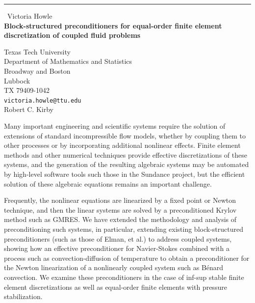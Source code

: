 \documentclass{report}
\begin{document}
\begin{center}
\rule{6in}{1pt} \
{\large Victoria Howle \\
{\bf Block-structured preconditioners for equal-order finite element discretization of coupled fluid problems}}

Texas Tech University \\ Department of Mathematics and Statistics \\ Broadway and Boston \\ Lubbock \\ TX 79409-1042
\\
{\tt victoria.howle@ttu.edu}\\
Robert C.  Kirby\end{center}

Many important engineering and scientific systems require the solution of
extensions of standard incompressible flow models, whether by coupling
them to other processes or by incorporating additional nonlinear effects.
Finite element methods and other numerical techniques provide effective
discretizations of these systems, and the generation of the resulting
algebraic systems may be automated by high-level software tools such
those in the Sundance project, but the efficient solution of these
algebraic equations remains an important challenge.

Frequently, the nonlinear equations are linearized by a fixed point or
Newton technique, and then the linear systems are solved by a
preconditioned Krylov method such as GMRES. We have extended the
methodology and analysis of preconditioning such systems, in particular,
extending existing block-structured preconditioners
(such as those of Elman, et al.) to address coupled systems, showing how
an effective preconditioner for Navier-Stokes combined with a process
such as convection-diffusion of temperature to obtain a preconditioner
for the Newton linearization of a nonlinearly coupled system such as
B\'enard convection. We examine these preconditioners in the case of
inf-sup stable finite element discretizations as well as equal-order
finite elements with pressure stabilization.
\end{document}
